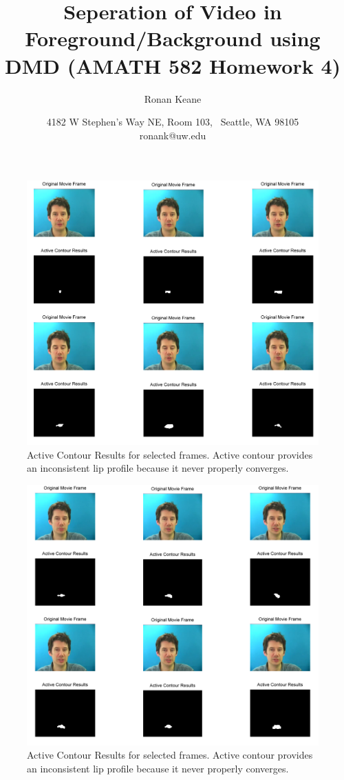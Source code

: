 \documentclass{article}
\title{Seperation of Video in Foreground/Background using DMD (AMATH 582 Homework 4)}
\author{Ronan Keane}
\date{4182 W Stephen's Way NE, Room 103, ~Seattle, WA 98105 \\ ~ronank@uw.edu~}
\begin{document}
\maketitle

\begin{figure}
	\centering
	\includegraphics[width=1\textwidth]{AC1.png}
	\caption{Active Contour Results for selected frames. Active contour provides an inconsistent lip profile because it never properly converges.}
\end{figure}

\begin{figure}
	\centering
	\includegraphics[width=1\textwidth]{AC2.png}
	\caption{Active Contour Results for selected frames. Active contour provides an inconsistent lip profile because it never properly converges.}
\end{figure}
\end{document}
